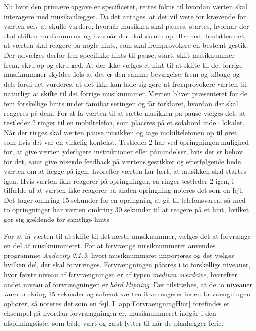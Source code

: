 Nu hvor den primære opgave er specificeret, rettes fokus til hvordan værten skal interagere med musikanlægget. Da det antages, at det vil være for krævende for værten selv at skulle vurdere, hvornår musikken skal pauses, startes, hvornår der skal skiftes musiknummer og hvornår der skal skrues op eller ned, besluttes det, at værten skal reagere på nogle hints, som skal fremprovokere en bestemt gestik. Der udvælges derfor fem specifikke hints til pause, start, skift musiknummer frem, skru op og skru ned. At der ikke vælges et hint til at skifte til det forrige musiknummer skyldes dels at det er den samme bevægelse; frem og tilbage og dels fordi det vurderes, at det ikke kan lade sig gøre at fremprovokere værten til naturligt at skifte til det forrige musiknummer. Værten bliver præsenteret for de fem forskellige hints under familiariseringen og får forklaret, hvordan der skal reageres på dem. For at få værten til at sætte musikken på pause vælges det, at testleder 2 ringer til en mobiltelefon, som placeres på et sofabord inde i lokalet. Når der ringes skal værten pause musikken og tage mobiltelefonen op til øret, som hvis det var en virkelig kontekst. Testleder 2 har ved opringningen mulighed for, at give værten yderligere instruktioner eller påmindelser, hvis der er behov for det, samt give rosende feedback på værtens gestikker og efterfølgende bede værten om at lægge på igen, hvorefter værten har lært, at musikken skal startes igen. Hvis værten ikke reagerer på opringningen, så ringer testleder 2 igen, i tilfælde af at værten ikke reagerer på anden opringning noteres det som en fejl. Det tager omkring 15 sekunder for en opringning at gå til telefonsvaren, så med to opringninger har værten omkring 30 sekunder til at reagere på et hint, hvilket gør sig gældende for samtlige hints. 

For at få værten til at skifte til det næste musiknummer, vælges det at forvrænge en del af musiknummeret. For at forvrænge musiknummeret anvendes programmet \textit{Audacity 2.1.3}, hvori musiknummeret importeres og det vælges hvilken del, der skal forvrænges. Forvrængningen påføres i to forskellige niveauer, hvor første niveau af forvrængningen er af typen \textit{medium overdrive}, hvorefter andet niveau af forvrængningen er \textit{hård klipning}. Det tilstræbes, at de to niveauer varer omkring 15 sekunder og såfremt værten ikke reagerer inden forvrængningen ophører, så noteres det som en fejl. I \autoref{app:ForvraengningHint} forefindes et eksempel på hvordan forvrængningen er, musiknummeret indgår i den afspilningsliste, som både vært og gæst lytter til når de planlægger ferie. 

